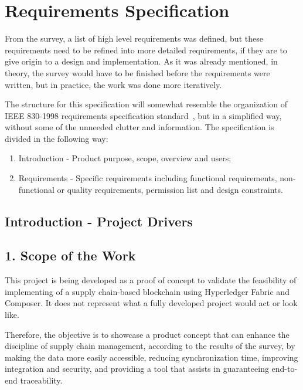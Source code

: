 \section{Requirements Specification}
\label{sec:requirements-specs}
From the survey, a list of high level requirements was defined, but these requirements need to be refined into more detailed requirements, if they are to give origin to a design and implementation. As it was already mentioned, in theory, the survey would have to be finished before the requirements were written, but in practice, the work was done more iteratively.

The structure for this specification will somewhat resemble the organization of IEEE 830-1998 requirements specification standard~\cite{720574}, but in a simplified way, without some of the unneeded clutter and information. The specification is divided in the following way:
\begin{enumerate}
	\item Introduction - Product purpose, scope, overview and users;
	\item Requirements - Specific requirements including functional requirements, non-functional or quality requirements, permission list and design constraints.
\end{enumerate}

\subsection{Introduction - Project Drivers}

\subsection*{1. Scope of the Work}
		\par This project is being developed as a proof of concept to validate the feasibility of implementing of a supply chain-based blockchain using Hyperledger Fabric and Composer. It does not represent what a fully developed project would act or look like.

		\par Therefore, the objective is to showcase a product concept that can enhance the discipline of supply chain management, according to the results of the survey, by making the data more easily accessible, reducing synchronization time, improving integration and security, and providing a tool that assists in guaranteeing end-to-end traceability.

